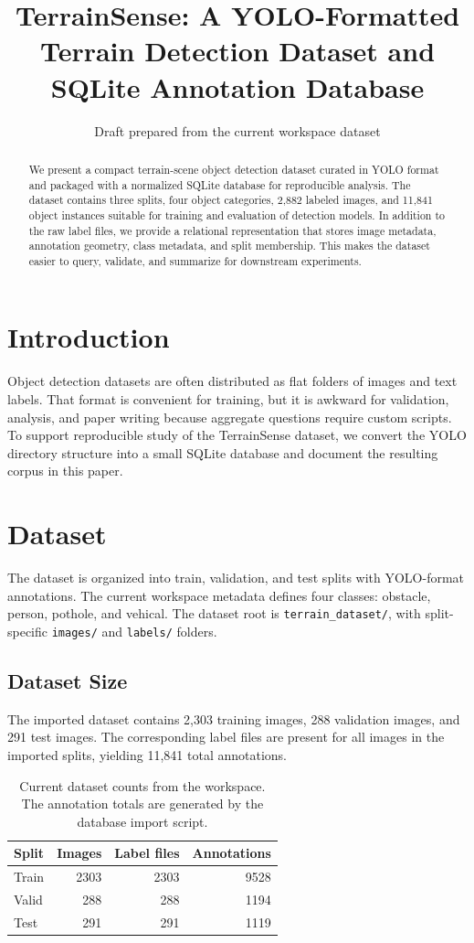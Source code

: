 \documentclass[11pt]{article}
\title{TerrainSense: A YOLO-Formatted Terrain Detection Dataset and SQLite Annotation Database}
\author{Draft prepared from the current workspace dataset}
\date{}
\begin{document}
\maketitle

\begin{abstract}
We present a compact terrain-scene object detection dataset curated in YOLO format and packaged with a normalized SQLite database for reproducible analysis. The dataset contains three splits, four object categories, 2,882 labeled images, and 11,841 object instances suitable for training and evaluation of detection models. In addition to the raw label files, we provide a relational representation that stores image metadata, annotation geometry, class metadata, and split membership. This makes the dataset easier to query, validate, and summarize for downstream experiments.
\end{abstract}

\section{Introduction}
Object detection datasets are often distributed as flat folders of images and text labels. That format is convenient for training, but it is awkward for validation, analysis, and paper writing because aggregate questions require custom scripts. To support reproducible study of the TerrainSense dataset, we convert the YOLO directory structure into a small SQLite database and document the resulting corpus in this paper.

\section{Dataset}
The dataset is organized into train, validation, and test splits with YOLO-format annotations. The current workspace metadata defines four classes: obstacle, person, pothole, and vehical. The dataset root is \texttt{terrain\_dataset/}, with split-specific \texttt{images/} and \texttt{labels/} folders.

\subsection{Dataset Size}
The imported dataset contains 2,303 training images, 288 validation images, and 291 test images. The corresponding label files are present for all images in the imported splits, yielding 11,841 total annotations.

\begin{table}[h]
\centering
\begin{tabular}{lrrr}
\toprule
Split & Images & Label files & Annotations \\
\midrule
Train & 2303 & 2303 & 9528 \\
Valid & 288 & 288 & 1194 \\
Test & 291 & 291 & 1119 \\
\bottomrule
\end{tabular}
\caption{Current dataset counts from the workspace. The annotation totals are generated by the database import script.}
\end{table}
\end{document}
